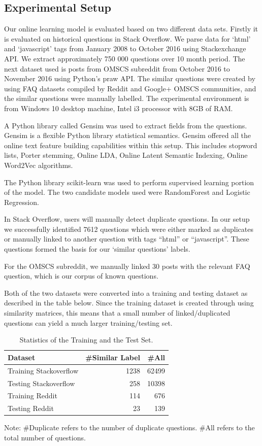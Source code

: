 \documentclass[journal]{IEEEtran}
\begin{document}
\subsection{Experimental Setup}

Our online learning model is evaluated based on two different data sets. Firstly it is evaluated on historical questions in Stack Overflow. We parse data for `html' and `javascript' tags from January 2008 to October 2016 using Stackexchange API. We extract approximately 750 000 questions over 10 month period. The next dataset used is posts from OMSCS subreddit from October 2016 to November 2016 using Python's praw API. The similar questions were created by using FAQ datasets compiled by Reddit and Google+ OMSCS communities, and the similar questions were manually labelled. The experimental environment is from Windows 10 desktop machine, Intel i3 processor with 8GB of RAM. 

A Python library called Gensim was used to extract fields from the questions. Gensim is a flexible Python library statistical semantics. Gensim offered all the online text feature building capabilities within this setup. This includes stopword lists, Porter stemming, Online LDA, Online Latent Semantic Indexing, Online Word2Vec algorithms.

The Python library scikit-learn was used to perform supervised learning portion of the model. The two candidate models used were RandomForest and Logistic Regression. 

In Stack Overflow, users will manually detect duplicate questions. In our setup we successfully identified 7612 questions which were either marked as duplicates or manually linked to another question with tags ``html'' or ``javascript''. These questions formed the basis for our `similar questions' labels. 

For the OMSCS subreddit, we manually linked 30 posts with the relevant FAQ question, which is our corpus of known questions. 

Both of the two datasets were converted into a training and testing dataset as described in the table below. Since the training dataset is created through using similarity matrices, this means that a small number of linked/duplicated questions can yield a much larger training/testing set. 

\begin{table}[!t]
\centering
\caption{Statistics of the Training and the Test Set.}
 \begin{tabular}{l r r } 
 \hline
 Dataset & \#Similar Label & \#All \\ 
 \hline
 Training Stackoverflow & 1238 & 62499 \\ 
 Testing Stackoverflow & 258 & 10398  \\
 Training Reddit & 114 &   676 \\
 Testing Reddit & 23 & 139  \\
 \hline
\end{tabular}

\hfill \break

Note: \#Duplicate refers to the number of duplicate questions. \#All refers to the total number of questions.
\end{table}
\end{document}
